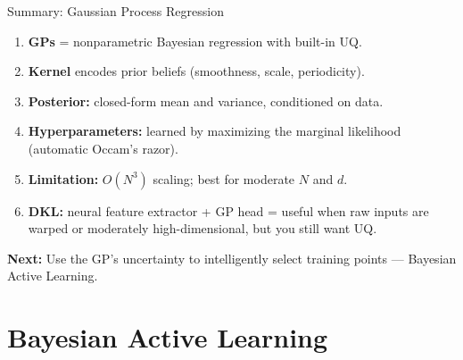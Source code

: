 \documentclass[aspectratio=169,11pt]{beamer}
\newcommand{\emphc}[1]{\textcolor{harvardcrimson}{#1}}
\begin{document}
\begin{frame}{Summary: Gaussian Process Regression}
\begin{enumerate}
  \item \textbf{GPs} = nonparametric Bayesian regression with \emphc{built-in UQ}.
  \item \textbf{Kernel} encodes prior beliefs (smoothness, scale, periodicity).
  \item \textbf{Posterior:} closed-form mean and variance, conditioned on data.
  \item \textbf{Hyperparameters:} learned by maximizing the marginal likelihood (automatic Occam's razor).
  \item \textbf{Limitation:} $O(N^3)$ scaling; best for moderate $N$ and $d$.
  \item \textbf{DKL:} neural feature extractor + GP head = useful when raw inputs are warped or moderately high-dimensional, but you still want UQ.
\end{enumerate}

\vspace{0.3cm}
\textbf{Next:} Use the GP's uncertainty to \emphc{intelligently select training points} --- Bayesian Active Learning.
\end{frame}

\section{Bayesian Active Learning}
\end{document}
